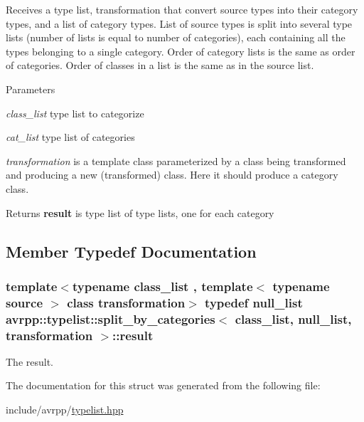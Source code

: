 Receives a type list, transformation that convert source types into their category types, and a list of category types. List of source types is split into several type lists (number of lists is equal to number of categories), each containing all the types belonging to a single category. Order of category lists is the same as order of categories. Order of classes in a list is the same as in the source list. 
\begin{DoxyParams}{Parameters}
\item[{\em class\_\-list}]type list to categorize \item[{\em cat\_\-list}]type list of categories \item[{\em transformation}]is a template class parameterized by a class being transformed and producing a new (transformed) class. Here it should produce a category class. \end{DoxyParams}
\begin{DoxyReturn}{Returns}
{\bfseries result} is type list of type lists, one for each category 
\end{DoxyReturn}


\subsection{Member Typedef Documentation}
\hypertarget{structavrpp_1_1typelist_1_1split__by__categories_3_01class__list_00_01null__list_00_01transformation_01_4_abfde550ed6b71f7e9fb56f49f07734a4}{
\subsubsection[{result}]{\setlength{\rightskip}{0pt plus 5cm}template$<$typename class\_\-list , template$<$ typename source $>$ class transformation$>$ typedef {\bf null\_\-list} avrpp::typelist::split\_\-by\_\-categories$<$ class\_\-list, {\bf null\_\-list}, transformation $>$::{\bf result}}}
\label{structavrpp_1_1typelist_1_1split__by__categories_3_01class__list_00_01null__list_00_01transformation_01_4_abfde550ed6b71f7e9fb56f49f07734a4}


The result. 



The documentation for this struct was generated from the following file:\begin{DoxyCompactItemize}
\item 
include/avrpp/\hyperlink{typelist_8hpp}{typelist.hpp}\end{DoxyCompactItemize}
